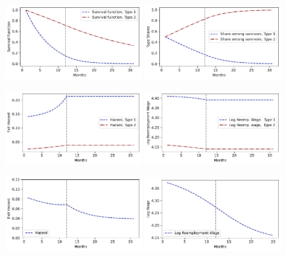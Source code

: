 \documentclass[letter, 10pt]{article}
\begin{document}
 

 
\includegraphics[clip=true,trim=0cm 0cm 0cm 0cm,width = 0.45\textwidth]{figures_Est1_compiled/fig_type_agg_surv.pdf} 
\includegraphics[clip=true,trim=0cm 0cm 0cm 0cm,width = 0.45\textwidth]{figures_Est1_compiled/fig_type_agg_share.pdf} 
 

 
\includegraphics[clip=true,trim=0cm 0cm 0cm 0cm,width = 0.45\textwidth]{figures_Est1_compiled/fig_type_agg_hazard.pdf} 
\includegraphics[clip=true,trim=0cm 0cm 0cm 0cm,width = 0.45\textwidth]{figures_Est1_compiled/fig_type_agg_w.pdf} 

 

 
\includegraphics[clip=true,trim=0cm 0cm 0cm 0cm,width = 0.45\textwidth]{figures_Est1_compiled/fig_haz_agg.pdf}
\includegraphics[clip=true,trim=0cm 0cm 0cm 0cm,width = 0.45\textwidth]{figures_Est1_compiled/fig_wage_agg.pdf} 
\end{document}
